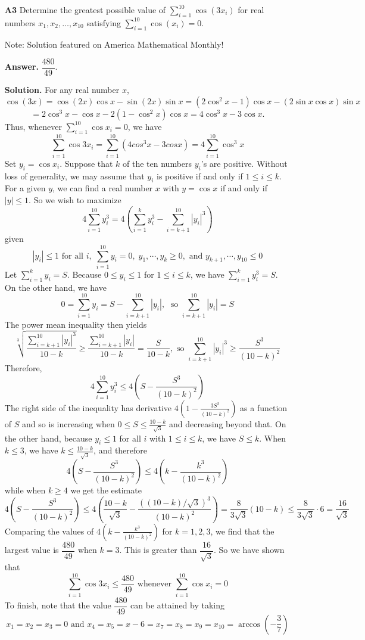 \documentclass[11pt,a4paper]{article}
\newcommand{\<}{\langle}
\renewcommand{\>}{\rangle}
\begin{document}
\begin{enumerate}
	\item[\textbf{A3}] 
	Determine the greatest possible value of $\sum_{i = 1}^{10} \cos(3x_i)$ for real numbers $x_1, x_2, \dots, x_{10}$ satisfying $\sum_{i = 1}^{10} \cos(x_i) = 0$.
	
	Note: Solution featured on America Mathematical Monthly!
	
	\textbf{Answer.} $\dfrac{480}{49}$. 
	
	\textbf{Solution.} 
	For any real number $x$, 
	\[
	\cos(3x) = 
	\cos(2x) \cos x
	 - \sin(2x) \sin x 
	 = (2 \cos^2 x - 1) \cos x - (2 \sin x \cos x) \sin x
	\]
	\[
	= 2 \cos^3 x - \cos x - 2(1 - \cos^2 x) \cos x = 4 \cos^3 x - 3 \cos x.
	\]
	Thus, whenever $\sum_{i=1}^{10} \cos x_i=0$, we have 
	\[
	\sum_{i=1}^{10} \cos 3x_i
	=\sum_{i=1}^{10} (4 cos^3 x - 3 cos x)
	=4\sum_{i=1}^{10}\cos^3 x
	\]
	Set $y_i=\cos x_i$. 
	Suppose that $k$ of the ten numbers $y_i$'s are positive. 
	Without loss of generality, we may assume that $y_i$ is positive if and only if $1\le i\le k$. 
	For a given $y$, we can find a real number $x$ with $y = \cos x$ if and only if $|y| \le 1$. 
	So we wish to maximize 
	\[
	4\sum_{i=1}^{10}y_i^3
	=4\left(\sum_{i=1}^{k} y_i^3 - \sum_{i=k+1}^{10} |y_i|^3\right)
	\]
	given 
	\[
	|y_i|\le 1\text{ for all } i, \; \sum_{i=1}^{10} y_i=0, \;
	y_1, \cdots, y_k\ge 0, \text{ and }
	y_{k+1}, \cdots, y_{10}\le 0
	\]
	Let $\sum_{i=1}^{k} y_i=S$. 
	Because $0\le y_i\le 1$ for $1\le i\le k$, 
	we have $\sum_{i=1}^{k} y_i^3=S$. 
	On the other hand, we have 
	\[
	0 = \sum_{i=1}^{10} y_i = S - \sum_{i=k+1}^{10} |y_i|, \;
	\text{ so } \sum_{i=k+1}^{10} |y_i| = S
	\]
	The power mean inequality then yields 
	\[
	\sqrt[3]{\frac{\sum_{i=k+1}^{10} |y_i|^3}{10-k}}
	\ge \frac{\sum_{i=k+1}^{10} |y_i|}{10-k}
	=\frac{S}{10-k},
	\text{ so }
	\sum_{i=k+1}^{10} |y_i|^3\ge\frac{S^3}{(10-k)^2}
	\]
	Therefore, 
	\[
	4\sum_{i=1}^{10}y_i^3
	\le 
	4\left(S - \frac{S^3}{(10-k)^2}\right)
	\]
	The right side of the inequality has derivative 
	$4(1-\frac{3S^2}{(10-k)^2})$ as a function of $S$ 
	and so is increasing when $0\le S\le \frac{10-k}{\sqrt{3}}$ and decreasing beyond that. 
	On the other hand, because $y_i\le 1$ for all $i$ with $1\le i\le k$, we have 
	$S\le k$. 
	When $k\le 3$, we have $k\le \frac{10-k}{\sqrt{3}}$, and therefore 
	\[
	4\left(S - \frac{S^3}{(10-k)^2}\right)
	\le 4\left(k - \frac{k^3}{(10-k)^2}\right)
	\]
	while when $k\ge 4$ we get the estimate 
	\[
	4\left(S - \frac{S^3}{(10-k)^2}\right)
	\le 
	4\left(\frac{10-k}{\sqrt{3}} - \frac{((10-k)/\sqrt{3})^3}{(10-k)^2}\right)
	=\frac{8}{3\sqrt{3}}(10-k)
	\le \frac{8}{3\sqrt{3}}\cdot 6
	=\frac{16}{\sqrt{3}}
	\]
	Comparing the values of 
	$4\left(k - \frac{k^3}{(10-k)^2}\right)$ for $k=1, 2, 3$, 
	we find that the largest value is $\dfrac{480}{49}$
	when $k=3$. This is greater than $\dfrac{16}{\sqrt{3}}$. 
	So we have shown that 
	\[
	\sum_{i=1}^{10}\cos 3x_i\le \frac{480}{49}
	\text{ whenever }
	\sum_{i=1}^{10}\cos x_i = 0
	\]
	To finish, note that the value $\dfrac{480}{49}$ can be attained by taking 
	\[
	x_1=x_2=x_3=0
	\text{ and }
	x_4=x_5=x-6=x_7=x_8=x_9=x_{10}=\arccos\left(-\frac{3}{7}\right)
	\]
	

\end{enumerate}
\end{document}
